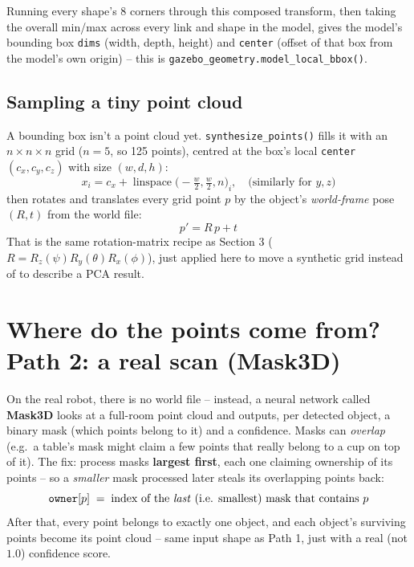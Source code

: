 \documentclass[11pt]{article}
\begin{document}
\begin{center}
\end{center}

Running every shape's 8 corners through this composed transform, then taking
the overall min/max across every link and shape in the model, gives the
model's bounding box \texttt{dims} (width, depth, height) and \texttt{center}
(offset of that box from the model's own origin) -- this is
\texttt{gazebo\_geometry.model\_local\_bbox()}.

\subsection{Sampling a tiny point cloud}

A bounding box isn't a point cloud yet. \texttt{synthesize\_points()} fills
it with an $n\times n\times n$ grid ($n=5$, so 125 points), centred at the
box's local \texttt{center} $(c_x,c_y,c_z)$ with size $(w,d,h)$:
\[
x_i = c_x + \operatorname{linspace}\!\big(-\tfrac{w}{2}, \tfrac{w}{2}, n\big)_i,
\quad \text{(similarly for } y, z \text{)}
\]
then rotates and translates every grid point $p$ by the object's
\emph{world-frame} pose $(R, t)$ from the world file:
\[
p' = R\,p + t
\]
That is the same rotation-matrix recipe as Section 3 ($R = R_z(\psi)R_y(\theta)R_x(\phi)$), just applied here to move a synthetic grid instead of to describe a PCA result.

\section{Where do the points come from? Path 2: a real scan (Mask3D)}

On the real robot, there is no world file -- instead, a neural network
called \textbf{Mask3D} looks at a full-room point cloud and outputs, per
detected object, a binary mask (which points belong to it) and a confidence.
Masks can \emph{overlap} (e.g.\ a table's mask might claim a few points that
really belong to a cup on top of it). The fix: process masks
\textbf{largest first}, each one claiming ownership of its points --
so a \emph{smaller} mask processed later steals its overlapping points back:
\[
\texttt{owner}[p] \;=\; \text{index of the \emph{last} (i.e. smallest) mask that contains } p
\]
After that, every point belongs to exactly one object, and each object's
surviving points become its point cloud -- same input shape as Path 1, just
with a real (not $1.0$) confidence score.
\end{document}
